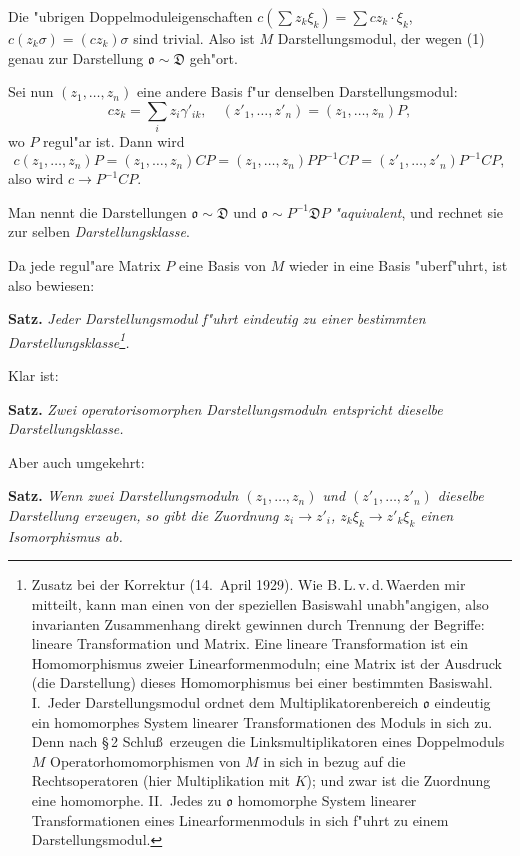 \documentclass[12pt,a4paper]{article}
\theoremstyle{plain}
\begin{document}
Die "ubrigen Doppelmoduleigenschaften $c(\sum z_k\xi_k) = \sum cz_k \cdot \xi_k$, $c(z_k\sigma) = (cz_k)\sigma$ sind trivial. Also ist $M$ Darstellungsmodul, der wegen (1) genau zur Darstellung $\mathfrak{o} \sim \mathfrak{D}$ geh"ort.

Sei nun $(z_1,\ldots,z_n)$ eine andere Basis f"ur denselben Darstellungsmodul:
\[
cz_k = \sum_i z_i\gamma'_{ik},\quad(z'_1,\ldots,z'_n) = (z_1,\ldots,z_n)P,
\]
wo $P$ regul"ar ist. Dann wird
\[
c(z_1,\ldots,z_n)P = (z_1,\ldots,z_n)CP = (z_1,\ldots,z_n)PP^{-1}CP = (z'_1,\ldots,z'_n)P^{-1}CP,
\]
also wird $c \to P^{-1}CP$.

Man nennt die Darstellungen $\mathfrak{o} \sim \mathfrak{D}$ und $\mathfrak{o} \sim P^{-1}\mathfrak{D}P$ \textit{"aquivalent}, und rechnet sie zur selben \textit{Darstellungsklasse}.

Da jede regul"are Matrix $P$ eine Basis von $M$ wieder in eine Basis "uberf"uhrt, ist also bewiesen:

\medskip\noindent\textbf{Satz.}
\textit{Jeder Darstellungsmodul f"uhrt eindeutig zu einer bestimmten Darstellungsklasse\footnote{Zusatz bei der Korrektur (14.\ April 1929). Wie B.\,L.\,v.\,d.\,Waerden mir mitteilt, kann man einen von der speziellen Basiswahl unabh"angigen, also invarianten Zusammenhang direkt gewinnen durch Trennung der Begriffe: lineare Transformation und Matrix. Eine lineare Transformation ist ein Homomorphismus zweier Linearformenmoduln; eine Matrix ist der Ausdruck (die Darstellung) dieses Homomorphismus bei einer bestimmten Basiswahl. I.\ Jeder Darstellungsmodul ordnet dem Multiplikatorenbereich $\mathfrak{o}$ eindeutig ein homomorphes System linearer Transformationen des Moduls in sich zu. Denn nach \S\,2 Schlu\ss\ erzeugen die Linksmultiplikatoren eines Doppelmoduls $M$ Operatorhomomorphismen von $M$ in sich in bezug auf die Rechtsoperatoren (hier Multiplikation mit $K$); und zwar ist die Zuordnung eine homomorphe. II.\ Jedes zu $\mathfrak{o}$ homomorphe System linearer Transformationen eines Linearformenmoduls in sich f"uhrt zu einem Darstellungsmodul.}.}

\medskip
Klar ist:

\noindent\textbf{Satz.}
\textit{Zwei operatorisomorphen Darstellungsmoduln entspricht dieselbe Darstellungsklasse.}

Aber auch umgekehrt:

\noindent\textbf{Satz.}
\textit{Wenn zwei Darstellungsmoduln $(z_1,\ldots,z_n)$ und $(z'_1,\ldots,z'_n)$ dieselbe Darstellung erzeugen, so gibt die Zuordnung $z_i \to z'_i$, $z_k\xi_k \to z'_k\xi_k$ einen Isomorphismus ab.}
\end{document}

